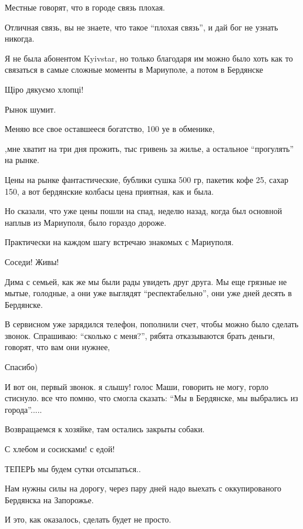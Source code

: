 Местные говорят, что в городе связь плохая.

Отличная связь, вы не знаете, что такое \enquote{плохая связь}, и дай бог не узнать
никогда.

Я  не была  абонентом Kyivstar, но  только благодаря им можно было хоть  как
то  связаться в самые сложные моменты в Мариуполе, а потом в Бердянске

Щіро дякуємо хлопці!

Рынок шумит.

Меняю все свое оставшееся богатство, 100 уе в обменике,

,мне хватит на три дня прожить, тыс гривень за жилье, а остальное \enquote{прогулять} на
рынке.

Цены на рынке фантастические, бублики сушка 500 гр, пакетик кофе 25, сахар
150, а вот бердянские колбасы цена приятная, как и была.

Но сказали, что уже цены пошли на спад, неделю назад, когда был основной
наплыв из Мариуполя, было гораздо дороже.

Практически на каждом шагу встречаю знакомых с Мариуполя.  


Соседи! Живы!

Дима с семьей, как же мы были рады увидеть друг друга. Мы еще грязные не мытые,
голодные, а они уже выглядят \enquote{респектабельно}, они уже дней десять в Бердянске.

В сервисном уже зарядился телефон, пополнили счет, чтобы можно было сделать
звонок. Спрашиваю: \enquote{сколько с меня?}, рябята отказываются брать деньги,
говорят, что вам они нужнее, 

Спасибо)

И вот он, первый звонок. я слышу! голос Маши, говорить не могу, горло
стиснуло. все что помню, что смогла сказать: \enquote{Мы в Бердянске, мы выбрались из
города}.....


Возвращаемся к хозяйке, там остались закрыты собаки.

С хлебом и сосисками! с едой!

ТЕПЕРЬ мы  будем сутки отсыпаться..

Нам нужны силы на дорогу, через пару дней надо выехать с оккупированого
Бердянска на Запорожье.

И это, как оказалось, сделать будет не просто.

